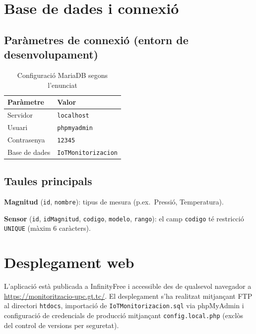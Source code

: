 \documentclass[12pt, a4paper]{article}
\begin{document}
\section{Base de dades i connexió}

\subsection{Paràmetres de connexió (entorn de desenvolupament)}

\begin{table}[h!]
  \centering
  \caption{Configuració MariaDB segons l'enunciat}
  \begin{tabular}{ll}
    \toprule
    Paràmetre   & Valor \\
    \midrule
    Servidor    & \texttt{localhost} \\
    Usuari      & \texttt{phpmyadmin} \\
    Contrasenya & \texttt{12345} \\
    Base de dades & \texttt{IoTMonitorizacion} \\
    \bottomrule
  \end{tabular}
\end{table}

\subsection{Taules principals}

\textbf{Magnitud} (\texttt{id}, \texttt{nombre}): tipus de mesura (p.ex.\ Pressió, Temperatura).

\textbf{Sensor} (\texttt{id}, \texttt{idMagnitud}, \texttt{codigo}, \texttt{modelo}, \texttt{rango}): el camp \texttt{codigo} té restricció \texttt{UNIQUE} (màxim 6 caràcters).

\section{Desplegament web}

L'aplicació està publicada a InfinityFree i accessible des de qualsevol navegador a \url{https://monitoritzacio-upc.gt.tc/}. El desplegament s'ha realitzat mitjançant FTP al directori \texttt{htdocs}, importació de \texttt{IoTMonitorizacion.sql} via phpMyAdmin i configuració de credencials de producció mitjançant \texttt{config.local.php} (exclòs del control de versions per seguretat).
\end{document}
